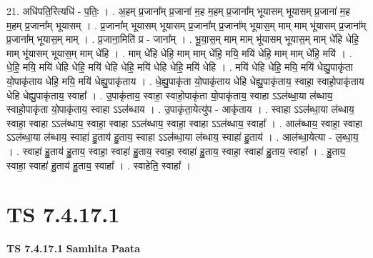 \documentclass[17pt]{extarticle}
\begin{document}
21. अधि॑पति॒रित्यधि॑ - प॒तिः॒ । . अ॒हम् प्र॒जाना᳚म् प्र॒जाना॑ म॒ह म॒हम् प्र॒जाना᳚म् भूयासम् भूयासम् प्र॒जाना॑ म॒ह म॒हम् प्र॒जाना᳚म् भूयासम् । . प्र॒जाना᳚म् भूयासम् भूयासम् प्र॒जाना᳚म् प्र॒जाना᳚म् भूयास॒म् माम् माम् भू॑यासम् प्र॒जाना᳚म् प्र॒जाना᳚म् भूयास॒म् माम् । . प्र॒जाना॒मिति॑ प्र - जाना᳚म् । . भू॒या॒स॒म् माम् माम् भू॑यासम् भूयास॒म् माम् धे॑हि धेहि॒ माम् भू॑यासम् भूयास॒म् माम् धे॑हि । . माम् धे॑हि धेहि॒ माम् माम् धे॑हि॒ मयि॒ मयि॑ धेहि॒ माम् माम् धे॑हि॒ मयि॑ । . धे॒हि॒ मयि॒ मयि॑ धेहि धेहि॒ मयि॑ धेहि धेहि॒ मयि॑ धेहि धेहि॒ मयि॑ धेहि । . मयि॑ धेहि धेहि॒ मयि॒ मयि॑ धेह्यु॒पाकृ॑ता यो॒पाकृ॑ताय धेहि॒ मयि॒ मयि॑ धेह्यु॒पाकृ॑ताय । . धे॒ह्यु॒पाकृ॑ता यो॒पाकृ॑ताय धेहि धेह्यु॒पाकृ॑ताय॒ स्वाहा॒ स्वाहो॒पाकृ॑ताय धेहि धेह्यु॒पाकृ॑ताय॒ स्वाहा᳚ । . उ॒पाकृ॑ताय॒ स्वाहा॒ स्वाहो॒पाकृ॑ता यो॒पाकृ॑ताय॒ स्वाहा ऽऽल॑ब्धा॒या ल॑ब्धाय॒ स्वाहो॒पाकृ॑ता
यो॒पाकृ॑ताय॒ स्वाहा ऽऽल॑ब्धाय । . उ॒पाकृ॑ता॒येत्यु॑प - आकृ॑ताय । . स्वाहा ऽऽल॑ब्धा॒या ल॑ब्धाय॒ स्वाहा॒ स्वाहा ऽऽल॑ब्धाय॒ स्वाहा॒ स्वाहा ऽऽल॑ब्धाय॒ स्वाहा॒ स्वाहा ऽऽल॑ब्धाय॒ स्वाहा᳚ । . आल॑ब्धाय॒ स्वाहा॒ स्वाहा ऽऽल॑ब्धा॒या ल॑ब्धाय॒ स्वाहा॑ हु॒ताय॑ हु॒ताय॒ स्वाहा ऽऽल॑ब्धा॒या ल॑ब्धाय॒ स्वाहा॑ हु॒ताय॑ । . आल॑ब्धा॒येत्या - ल॒ब्धा॒य॒ । . स्वाहा॑ हु॒ताय॑ हु॒ताय॒ स्वाहा॒ स्वाहा॑ हु॒ताय॒ स्वाहा॒ स्वाहा॑ हु॒ताय॒ स्वाहा॒ स्वाहा॑ हु॒ताय॒ स्वाहा᳚ । . हु॒ताय॒ स्वाहा॒ स्वाहा॑ हु॒ताय॑ हु॒ताय॒ स्वाहा᳚ । . स्वाहेति॒ स्वाहा᳚ । \newline
\pagebreak
{}

\section{ TS 7.4.17.1 }

\textbf{TS 7.4.17.1 } \newline
\textbf{Samhita Paata} \newline
\end{document}
